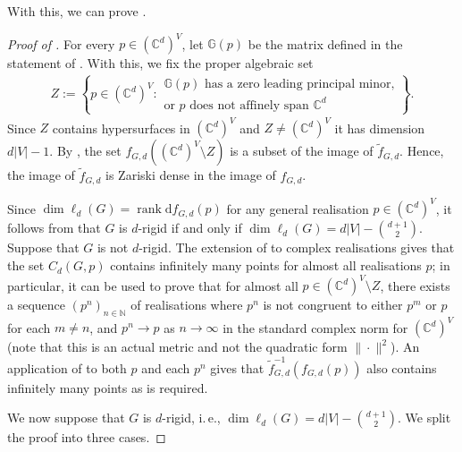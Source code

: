 \documentclass[11pt]{article}
\theoremstyle{definition}
\numberwithin{equation}{section}
\DeclareMathOperator{\rank}{rank}
\newcommand{\diff}{\mathrm{d}}
\begin{document}
With this, we can prove .


\begin{proof}[Proof of ]
	For every $p \in (\mathbb{C}^d)^V$,
	let $\mathbb{G}(p)$ be the matrix defined in the statement of .
	With this, we fix the proper algebraic set
	\begin{align*}
		Z := \left\{ p \in (\mathbb{C}^d)^V :
			\begin{array}{l}
				\text{$\mathbb{G}(p)$ has a zero leading principal minor,}\\
				\text{or $p$ does not affinely span $\mathbb{C}^d$}
			\end{array}
		 \right\}.
	\end{align*}
	Since $Z$ contains hypersurfaces in $(\mathbb{C}^d)^V$ and $Z \neq (\mathbb{C}^d)^V$
	it has dimension $d|V|-1$.
	By ,
	the set $f_{G,d}((\mathbb{C}^d)^V \setminus Z)$ is a subset of the image of $\tilde{f}_{G,d}$.	
	Hence, the image of $\tilde{f}_{G,d}$ is Zariski dense in the image of $f_{G,d}$.
	
	Since $\dim \ell_d(G) = \rank \diff f_{G,d}(p)$ for any general realisation $p\in (\mathbb{C}^d)^V$,
	it follows from  that $G$ is $d$-rigid if and only if $\dim \ell_d(G) = d|V|- \binom{d+1}{2}$.
	Suppose that $G$ is not $d$-rigid.
	The extension of  to complex realisations gives that the set $C_d(G,p)$ contains infinitely many points for almost all realisations $p$;
	in particular,
	it can be used to prove that for almost all $p \in (\mathbb{C}^d)^V \setminus Z$,
	there exists a sequence $(p^n)_{n \in \mathbb{N}}$ of realisations where $p^n$ is not congruent to either $p^m$ or $p$ for each $m \neq n$, and $p^n \rightarrow p$ as $n \rightarrow \infty$ in the standard complex norm for $(\mathbb{C}^d)^V$ (note that this is an actual metric and not the quadratic form $\| \cdot\|^2$).
	An application of  to both $p$ and each $p^n$ gives that $\tilde{f}_{G,d}^{-1}\left(f_{G,d}(p)\right)$ also contains infinitely many points as is required.
	
	We now suppose that $G$ is $d$-rigid,
	i.\,e., $\dim \ell_d(G) = d|V|- \binom{d+1}{2}$.
	We split the proof into three cases.
	

\end{proof}
\end{document}
